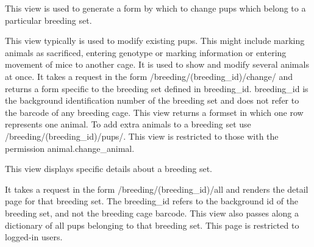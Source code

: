 \documentclass[letterpaper,10pt,english]{sphinxmanual}
\begin{document}

\begin{fulllineitems}
\label{api:mousedb.animal.views.breeding_change}
This view is used to generate a form by which to change pups which belong to a particular breeding set.

This view typically is used to modify existing pups.  This might include marking animals as sacrificed, entering genotype or marking information or entering movement of mice to another cage.  It is used to show and modify several animals at once.
It takes a request in the form /breeding/(breeding\_id)/change/ and returns a form specific to the breeding set defined in breeding\_id.  breeding\_id is the background identification number of the breeding set and does not refer to the barcode of any breeding cage.
This view returns a formset in which one row represents one animal.  To add extra animals to a breeding set use /breeding/(breeding\_id)/pups/.
This view is restricted to those with the permission animal.change\_animal.

\end{fulllineitems}



\begin{fulllineitems}
\label{api:mousedb.animal.views.breeding_detail}
This view displays specific details about a breeding set.

It takes a request in the form /breeding/(breeding\_id)/all and renders the detail page for that breeding set.
The breeding\_id refers to the background id of the breeding set, and not the breeding cage barcode.
This view also passes along a dictionary of all pups belonging to that breeding set.
This page is restricted to logged-in users.

\end{fulllineitems}


\end{document}

